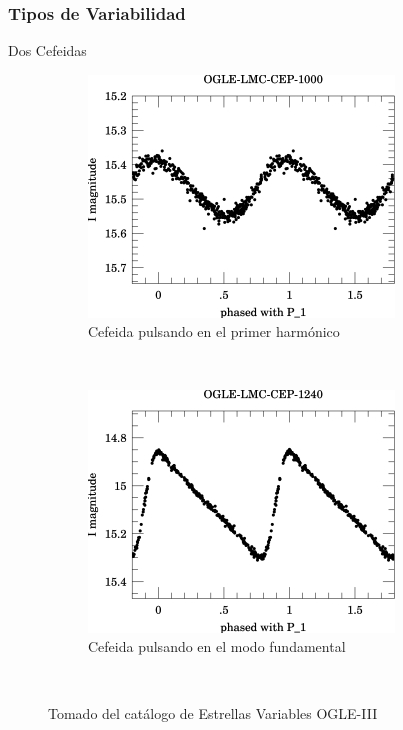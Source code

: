 \documentclass{beamer}
\begin{document}
\begin{frame}
  \frametitle{Tipos de Variabilidad}
  Dos Cefeidas
  \begin{figure}
    \centering
    \begin{subfigure}[b]{0.4\textwidth}
      \includegraphics[width=\textwidth]{./img/OGLE-LMC-CEP-1000_1.jpg}
      \caption{Cefeida pulsando en el primer harmónico}
    \end{subfigure}%
    ~ %
    \begin{subfigure}[b]{0.4\textwidth}
      \includegraphics[width=\textwidth]{./img/OGLE-LMC-CEP-1240_1.jpg}
      \caption{Cefeida  pulsando en el modo fundamental}
    \end{subfigure}
    ~ %
    \caption{Tomado del catálogo de Estrellas Variables OGLE-III}
  \end{figure}
\end{frame}
\end{document}
